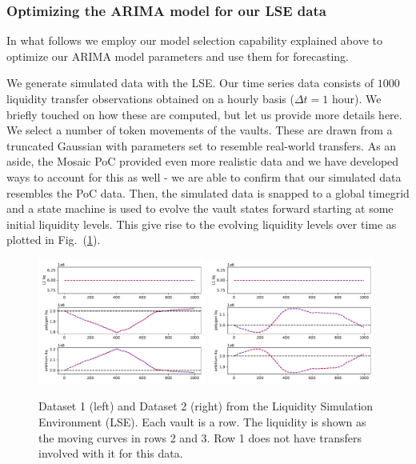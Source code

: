 \subsubsection*{Optimizing the ARIMA model for our LSE data}

In what follows we employ our model selection capability explained above to optimize our ARIMA model parameters and use them for forecasting.

We generate simulated data with the LSE. Our time series data consists of $1000$ liquidity transfer observations obtained on a hourly basis ($\Delta t = 1$ hour).
%
We briefly touched on how these are computed, but let us provide more details here. We select a number of token movements of the vaults. These are drawn from a truncated Gaussian with parameters set to resemble real-world transfers. As an aside, the Mosaic PoC provided even more realistic data and we have developed ways to account for this as well - we are able to confirm that our simulated data resembles the PoC data.
%
Then, the simulated data is snapped to a global timegrid and a state machine is used to evolve the vault states forward starting at some initial liquidity levels. This give rise to the evolving liquidity levels over time as plotted in Fig.~(\ref{fig:lse_datasets}).

\begin{figure}
    \centering
    \includegraphics[width=0.49\textwidth]{images/lse_results_feemodel_3_20_20211015_18_59_40_412997.pdf}
    \includegraphics[width=0.49\textwidth]{images/lse_results_feemodel_3_20_20211021_18_59_52_314364.pdf}
    \caption{Dataset 1 (left) and Dataset 2 (right) from the Liquidity Simulation Environment (LSE). Each vault is a row. The liquidity is shown as the moving curves in rows 2 and 3. Row 1 does not have transfers involved with it for this data.}
    \label{fig:lse_datasets}
\end{figure}

